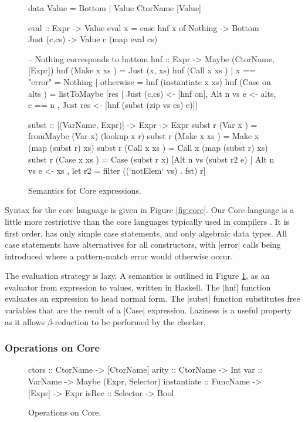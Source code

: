 \begin{figure}
\begin{code}
data Value = Bottom | Value CtorName [Value]

eval :: Expr -> Value
eval x = case  hnf x of
               Nothing      -> Bottom
               Just (c,cs)  -> Value c (map eval cs)

-- Nothing corresponds to bottom
hnf :: Expr -> Maybe (CtorName, [Expr])
hnf (Make  x   xs    )  =  Just (x, xs)
hnf (Call  x   xs    )  |  x == "error"  = Nothing
                        |  otherwise     = hnf (instantiate x xs)
hnf (Case  on  alts  )  =  listToMaybe [res
       |  Just (c,cs) <- [hnf on], Alt n vs e <- alts, c == n
       ,  Just res <- [hnf (subst (zip vs cs) e)]]

subst :: [(VarName, Expr)] -> Expr -> Expr
subst r (Var   x     ) = fromMaybe (Var x) (lookup x r)
subst r (Make  x xs  ) = Make  x (map (subst r) xs)
subst r (Call  x xs  ) = Call  x (map (subst r) xs)
subst r (Case  x xs  ) = Case (subst r x)
    [Alt n vs (subst r2 e) | Alt n vs e <- xs
    , let r2 = filter ((`notElem` vs) . fst) r]
\end{code}
\caption{Semantics for Core expressions.}
\label{fig:semantics}
\figureend
\end{figure}

Syntax for the core language is given in Figure \ref{fig:core}. Our Core language is a little more restrictive than the core languages typically used in compilers \citep{ghc_core}. It is first order, has only simple case statements, and only algebraic data types. All case statements have alternatives for all constructors, with |error| calls being introduced where a pattern-match error would otherwise occur.

The evaluation strategy is lazy. A semantics is outlined in Figure \ref{fig:semantics}, as an evaluator from expression to values, written in Haskell. The |hnf| function evaluates an expression to head normal form. The |subst| function substitutes free variables that are the result of a |Case| expression. Laziness is a useful property as it allows $\beta$-reduction to be performed by the checker.

\subsubsection{Operations on Core}

\begin{figure}
\begin{code}
ctors        :: CtorName  -> [CtorName]
arity        :: CtorName  -> Int
var          :: VarName   -> Maybe (Expr, Selector)
instantiate  :: FuncName  -> [Expr] -> Expr
isRec        :: Selector  -> Bool
\end{code}
\caption{Operations on Core.}
\label{fig:core_operations}
\figureend
\end{figure}

